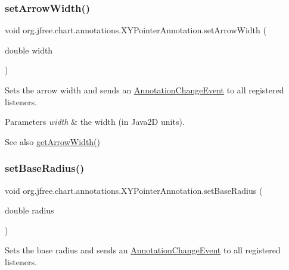 \subsubsection{\texorpdfstring{set\+Arrow\+Width()}{setArrowWidth()}}
{\footnotesize\ttfamily void org.\+jfree.\+chart.\+annotations.\+X\+Y\+Pointer\+Annotation.\+set\+Arrow\+Width (\begin{DoxyParamCaption}\item[{double}]{width }\end{DoxyParamCaption})}

Sets the arrow width and sends an \mbox{\hyperlink{}{Annotation\+Change\+Event}} to all registered listeners.


\begin{DoxyParams}{Parameters}
{\em width} & the width (in Java2D units).\\
\hline
\end{DoxyParams}
\begin{DoxySeeAlso}{See also}
\mbox{\hyperlink{classorg_1_1jfree_1_1chart_1_1annotations_1_1_x_y_pointer_annotation_a77602bfbf1eaac644b2832138d33cfd8}{get\+Arrow\+Width()}} 
\end{DoxySeeAlso}
\mbox{\label{classorg_1_1jfree_1_1chart_1_1annotations_1_1_x_y_pointer_annotation_a18b4429ee9df0dd4cb350f32defa55b8}} 
\subsubsection{\texorpdfstring{set\+Base\+Radius()}{setBaseRadius()}}
{\footnotesize\ttfamily void org.\+jfree.\+chart.\+annotations.\+X\+Y\+Pointer\+Annotation.\+set\+Base\+Radius (\begin{DoxyParamCaption}\item[{double}]{radius }\end{DoxyParamCaption})}

Sets the base radius and sends an \mbox{\hyperlink{}{Annotation\+Change\+Event}} to all registered listeners.


